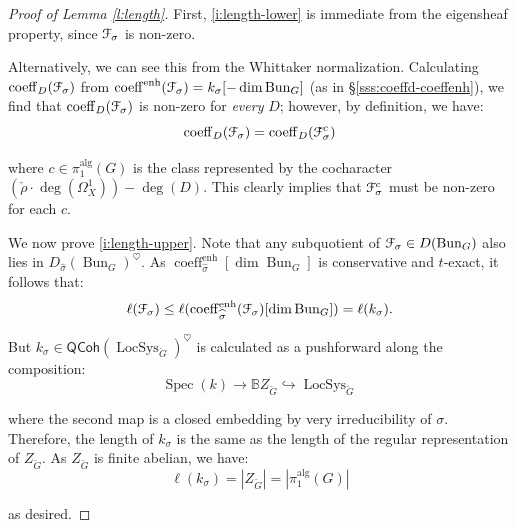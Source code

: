 \documentclass[reqno,11pt]{amsart}
\numberwithin{equation}{subsection}
\theoremstyle{remark}
\newcommand{\into}{\hookrightarrow}
\newcommand{\bB}{{\mathbb B}}
\newcommand{\sF}{{\EuScript F}}
\newcommand{\on}{\operatorname}
\newcommand{\Spec}{\on{Spec}}
\newcommand{\Bun}{\on{Bun}}
\newcommand{\LocSys}{\on{LocSys}}
\newcommand{\heart}{\heartsuit}
\newcommand{\QCoh}{\mathsf{QCoh}}
\newcommand{\coeff}{\on{coeff}}
\newcommand{\enh}{\on{enh}}
\begin{document}
\begin{proof}[Proof of Lemma \ref{l:length}]

First, \eqref{i:length-lower} is immediate from the eigensheaf property,
since $\sF_{\sigma}$ is non-zero. 

Alternatively, we can see this from the Whittaker normalization. Calculating
$\coeff_D(\sF_{\sigma})$ from $\coeff^{\enh}(\sF_{\sigma}) = 
k_{\sigma}[-\dim \Bun_G]$
(as in \S \ref{sss:coeffd-coeffenh}), we find that $\coeff_D(\sF_{\sigma})$
is non-zero for \emph{every} $D$; however, by definition, we have:
%
\[
\coeff_D(\sF_{\sigma}) = \coeff_D(\sF_{\sigma}^c)
\]

\noindent where $c \in \pi_1^{\on{alg}}(G)$ 
is the class represented by the cocharacter
$(\check{\rho}\cdot\deg(\Omega_X^1))-\deg(D)$. This clearly implies that $\sF_{\sigma}^c$
must be non-zero for each $c$.

We now prove \eqref{i:length-upper}. Note that any subquotient of
$\sF_{\sigma} \in D(\Bun_G)$ also lies in $D_{\widehat{\sigma}}(\Bun_G)^{\heart}$. 
As $\coeff_{\widehat{\sigma}}^{\enh}[\dim\Bun_G]$ 
is conservative and $t$-exact,
it follows that:
%
\begin{equation}\label{eq:length-ineq}
\ell(\sF_{\sigma}) \leq 
\ell(\coeff_{\widehat{\sigma}}^{\enh}(\sF_{\sigma})[\dim\Bun_G]) = 
\ell(k_{\sigma}).
\end{equation}

\noindent But $k_{\sigma} \in \QCoh(\LocSys_{\check{G}})^{\heart}$ 
is calculated as a pushforward along the composition:
%
\[
\Spec(k) \to \bB Z_{\check{G}} \into \LocSys_{\check{G}}
\]

\noindent where the second map is a closed embedding by very irreducibility of
$\sigma$. Therefore, the length of $k_{\sigma}$ is the same as the
length of the regular representation of $Z_{\check{G}}$. As 
$Z_{\check{G}}$ is finite abelian, we have:
%
\[
\ell(k_{\sigma}) = |Z_{\check{G}}| = |\pi_1^{\on{alg}}(G)|
\]

\noindent as desired.

\end{proof}
\end{document}

